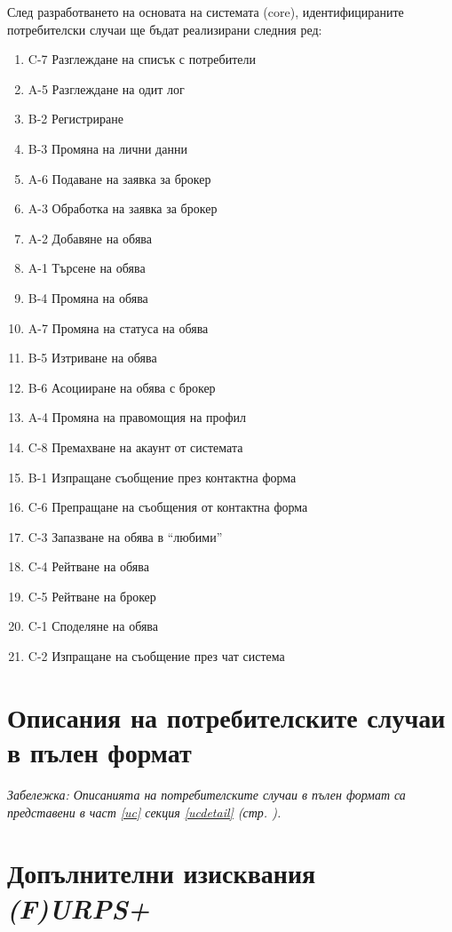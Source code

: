 \documentclass[a4paper]{article}
\begin{document}
След разработването на основата на системата (core), идентифицираните потребителски случаи ще бъдат реализирани следния ред:

\begin{enumerate}
\item C-7	Разглеждане на списък с потребители
\item A-5	Разглеждане на одит лог
\item B-2	Регистриране
\item B-3	Промяна на лични данни
\item A-6	Подаване на заявка за брокер
\item A-3	Обработка на заявка за брокер
\item A-2	Добавяне на обява
\item A-1	Търсене на обява
\item B-4	Промяна на обява
\item A-7	Промяна на статуса на обява
\item B-5	Изтриване на обява
\item B-6	Асоцииране на обява с брокер
\item A-4	Промяна на правомощия на профил
\item C-8	Премахване на акаунт от системата
\item B-1	Изпращане съобщение през контактна форма
\item C-6	Препращане на съобщения от контактна форма
\item C-3	Запазване на обява в ``любими''
\item C-4	Рейтване на обява
\item C-5	Рейтване на брокер
\item C-1	Споделяне на обява
\item C-2	Изпращане на съобщение през чат система
\end{enumerate}

\section{Описания на потребителските случаи в пълен формат}

\emph{Забележка: Описанията на потребителските случаи в пълен формат са представени в част \ref{uc} секция \ref{ucdetail}  (стр. \pageref{ucdetail}).} 

\section{Допълнителни изисквания \emph{(F)URPS+}}
\end{document}
